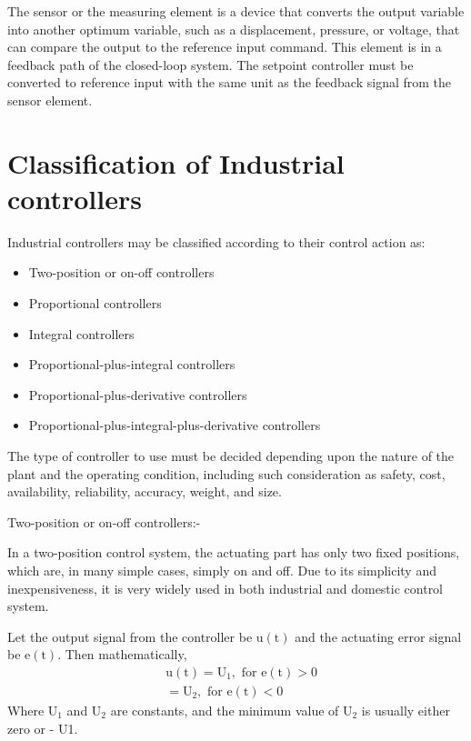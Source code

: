 The sensor or the measuring element is a device that converts the output variable into another optimum variable, such as a displacement, pressure, or voltage, that can compare the output to the reference input command. This element is in a feedback path of the closed-loop system. The setpoint controller must be converted to reference input with the same unit as 
the feedback signal from the sensor element.

\section{Classification of Industrial controllers}
 
 Industrial controllers may be classified according to their control action as: 
\begin{itemize}
\item Two-position or on-off controllers 
\item Proportional controllers 
\item Integral controllers 
\item Proportional-plus-integral controllers 
\item Proportional-plus-derivative controllers 
\item Proportional-plus-integral-plus-derivative controllers 
\end{itemize}
 
The type of controller to use must be decided depending upon the nature of the plant and 
the operating condition, including such consideration as safety, cost, availability, 
reliability, accuracy, weight, and size. 
 
Two-position or on-off controllers:- 
 
In a two-position control system, the actuating part has only two fixed positions, which are, in many simple cases, simply on and off. Due to its simplicity and inexpensiveness, it is very widely used in both industrial and domestic 
control system.

Let the output signal from the controller be $\mathrm{u}(\mathrm{t})$ and the actuating error signal be $\mathrm{e}(\mathrm{t})$. Then mathematically,
$$
\begin{aligned}
&\mathrm{u}(\mathrm{t})=\mathrm{U}_{1}, \text { for } \mathrm{e}(\mathrm{t})>0 \\
&=\mathrm{U}_{2}, \text { for } \mathrm{e}(\mathrm{t})<0
\end{aligned}
$$
Where $\mathrm{U}_{1}$ and $\mathrm{U}_{2}$ are constants, and the minimum value of $\mathrm{U}_{2}$ is usually either zero or - U1.

